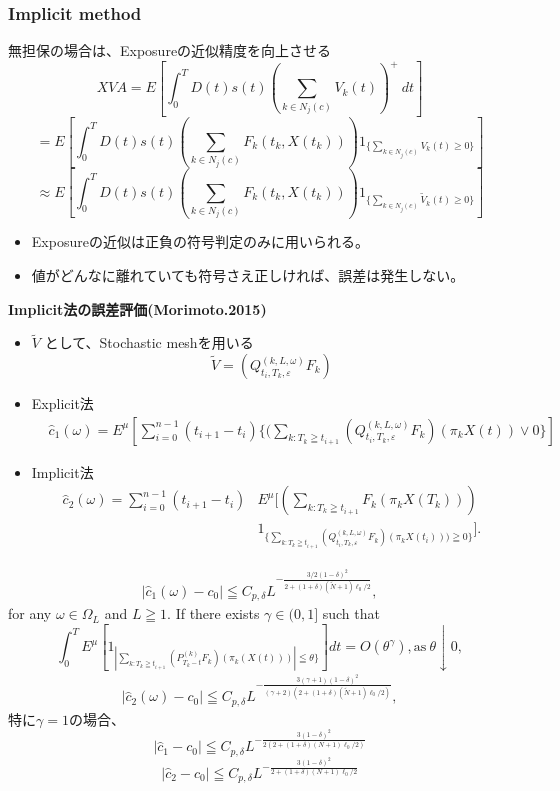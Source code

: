 \documentclass[driverfallback=dvipdfmx,cjk]{beamer}
\begin{document}
\begin{frame}\frametitle{Implicit method}
無担保の場合は、Exposureの近似精度を向上させる
$$ XVA = E\left[\int_0^T D(t)s(t)\left(\sum_{k \in N_j(c)}V_k(t)\right)^+ \ dt\right] $$
$$ = E\left[ \int_0^T D(t) s(t) \left(\sum_{k \in N_j(c)} F_k(t_k, X(t_k)) \right) 1_{\{\sum_{k \in N_j(c)} V_k(t) \ge 0 \}} \right] $$
$$\approx E\left[ \int_0^T D(t) s(t) \left(\sum_{k \in N_j(c)} F_k(t_k, X(t_k)) \right) 1_{\{\sum_{k \in N_j(c)} \tilde{V}_k(t) \ge 0 \}} \right] $$
\begin{itemize}
    \item Exposureの近似は正負の符号判定のみに用いられる。
    \item 値がどんなに離れていても符号さえ正しければ、誤差は発生しない。
\end{itemize}
\end{frame}

\begin{frame}
    \textbf{Implicit法の誤差評価(Morimoto.2015)}
    \begin{itemize}
        \item $\tilde{V}$ として、Stochastic meshを用いる
         $$\tilde{V} = (Q_{t_i,T_k,\varepsilon}^{(k,L,\omega)}F_k)$$
        \item Explicit法
        \begin{align*}
            &\hat{c}_1(\omega) =E^{\mu} [ \sum_{i=0}^{n-1}(t_{i+1}-t_{i}) \{(\sum_{k:T_k\geqq t_{i+1}} (Q_{t_i,T_k,\varepsilon}^{(k,L,\omega)}F_k)(\pi_k{X}(t))\vee0\} ]
        \end{align*}
        \item Implicit法
        \begin{align*}
            \hat{c}_2(\omega)=\sum_{i=0}^{n-1}(t_{i+1}-t_{i}) &E^{\mu}[( \sum_{k:T_k\geqq t_{i+1}}F_k(\pi_k X(T_k))) \\
             &1_{\{\sum_{k:T_k\geqq t_{i+1}} (Q_{t_i,T_k,\varepsilon}^{(k,L,\omega)}F_k)(\pi_k X(t_i))) \geqq 0\}}].
        \end{align*}


    \end{itemize}
\end{frame}

\begin{frame}
    \begin{align*}
    |\hat{c}_1(\omega)-c_0| \leqq C_{p,\delta}L^{-\frac{3/2(1-\delta)^2}{2+(1+\delta)(\tilde{N}+1)\ell_0/2}},
    \end{align*}
    for any $\omega \in \Omega_{L}$ and $L \geqq 1$.
    If there exists $\gamma \in (0,1]$ such that
$$\int_0^T E^{\mu}[ 1_{| \sum_{k:T_k\geqq t_{i+1}} (P_{T_k-t}^{(k)}F_k)(\pi_k (X(t)))| \leqq \theta\} } ]dt =O(\theta^{\gamma}), \text{as} \ \theta \downarrow 0,$$
 \begin{align*}
 |\hat{c}_2(\omega)-c_0| \leqq C_{p,\delta}L^{-\frac{3(\gamma+1)(1-\delta)^2}{(\gamma+2)(2+(1+\delta)(\tilde{N}+1)\ell_0/2)}},
 \end{align*}
特に$\gamma = 1$の場合、
$$|\hat{c}_1 - c_0| \leqq C_{p,\delta}L^{-\frac{3(1-\delta)^2}{2(2+(1+\delta)(N+1)\ell_0/2)}}$$ 
$$|\hat{c}_2 - c_0| \leqq C_{p,\delta}L^{-\frac{3(1-\delta)^2}{2+(1+\delta)(N+1)\ell_0/2}}$$ 
\end{frame}
\end{document}
